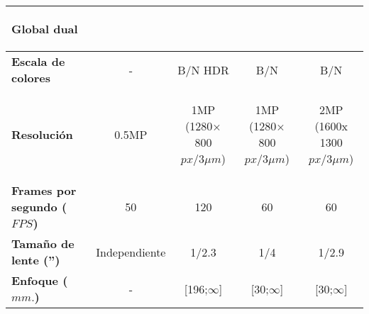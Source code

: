 \begin{savenotes}
\begin{mytable}[H]
\begin{tabular}{l|c|c|c|c|}
\begin{minipage}{\mythirdmaxsizeofcontenttable}
\begin{myflushcenterinsidetable}
			Global dual 
		\end{myflushcenterinsidetable}\end{minipage} \\ \hline
		\multicolumn{1}{|l|}{
			\begin{minipage}{\myforthmaxsizeofcontenttable}	
				\textbf{Escala de colores}
			\end{minipage}
		} & - & B/N HDR & B/N & B/N \\ \hline
		\multicolumn{1}{|l|}{
			\begin{minipage}{\myforthmaxsizeofcontenttable}	
				\textbf{Resolución}
			\end{minipage}
		} & 0.5MP & 
		\begin{minipage}{\mythirdmaxsizeofcontenttable}\begin{myflushcenterinsidetable}
				1MP (1280× 800 $px/3{\mu}m$)
		\end{myflushcenterinsidetable}\end{minipage} & 
		\begin{minipage}{\mythirdmaxsizeofcontenttable}\begin{myflushcenterinsidetable}
				1MP (1280× 800 $px/3{\mu}m$)
		\end{myflushcenterinsidetable}\end{minipage} & 
		\begin{minipage}{\mythirdmaxsizeofcontenttable}\begin{myflushcenterinsidetable}
				2MP (1600x 1300 $px/3{\mu}m$)
		\end{myflushcenterinsidetable}\end{minipage} \\ \hline
		\multicolumn{1}{|l|}{
			\begin{minipage}{\myforthmaxsizeofcontenttable}	
				\textbf{Frames por segundo ($FPS$)}
			\end{minipage}
		} & 50 %
		& 120 & 60 & 60 \\ \hline
		\multicolumn{1}{|l|}{
			\begin{minipage}{\myforthmaxsizeofcontenttable}	
				\textbf{Tamaño de lente ('')}
			\end{minipage}
		} & Independiente & 1/2.3 & 1/4 & 1/2.9 \\ \hline
		\multicolumn{1}{|l|}{
			\begin{minipage}{\myforthmaxsizeofcontenttable}	
				\textbf{Enfoque ($mm.$)}
			\end{minipage}
		} & - & [196;$\infty$] & [30;$\infty$] & [30;$\infty$] \\ \hline

\end{tabular}
\end{mytable}
\end{savenotes}
